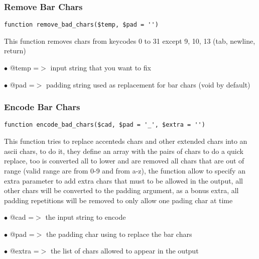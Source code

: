 \documentclass[a4paper]{article}
\begin{document}
\hypertarget{toc237}{}
\subsubsection{Remove Bar Chars}

\begin{lstlisting}
function remove_bad_chars($temp, $pad = '')
\end{lstlisting}

This function removes chars from keycodes 0 to 31 except 9, 10, 13 (tab,
newline, return)

\begin{compactitem}
\item[\color{myblue}$\bullet$] @temp =$>$ input string that you want to fix
\item[\color{myblue}$\bullet$] @pad  =$>$ padding string used as replacement for bar chars (void by default)
\end{compactitem}

\hypertarget{toc238}{}
\subsubsection{Encode Bar Chars}

\begin{lstlisting}
function encode_bad_chars($cad, $pad = '_', $extra = '')
\end{lstlisting}

This function tries to replace accenteds chars and other extended chars into
an ascii chars, to do it, they define an array with the pairs of chars to
do a quick replace, too is converted all to lower and are removed all chars
that are out of range (valid range are from 0-9 and from a-z), the function
allow to specify an extra parameter to add extra chars that must to be
allowed in the output, all other chars will be converted to the padding
argument, as a bonus extra, all padding repetitions will be removed to
only allow one pading char at time

\begin{compactitem}
\item[\color{myblue}$\bullet$] @cad   =$>$ the input string to encode
\item[\color{myblue}$\bullet$] @pad   =$>$ the padding char using to replace the bar chars
\item[\color{myblue}$\bullet$] @extra =$>$ the list of chars allowed to appear in the output
\end{compactitem}
\end{document}
